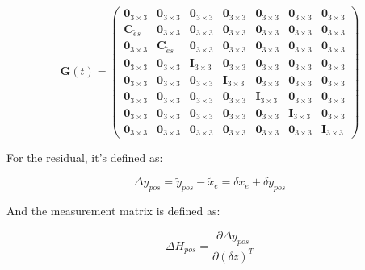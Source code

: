 \documentclass[conference]{IEEEtran}
\begin{document}
\begin{equation}
\mathbf{G}(t)=\left(\begin{array}{ccccccc}
\mathbf{0}_{3 \times 3} & \mathbf{0}_{3 \times 3} & \mathbf{0}_{3 \times 3} & \mathbf{0}_{3 \times 3} & \mathbf{0}_{3 \times 3} & \mathbf{0}_{3 \times 3} & \mathbf{0}_{3 \times 3} \\
\mathbf{C}_{\tilde{e} s} & \mathbf{0}_{3 \times 3} & \mathbf{0}_{3 \times 3} & \mathbf{0}_{3 \times 3} & \mathbf{0}_{3 \times 3} & \mathbf{0}_{3 \times 3} & \mathbf{0}_{3 \times 3} \\
\mathbf{0}_{3 \times 3} & \mathbf{C}_{\tilde{e} s} & \mathbf{0}_{3 \times 3} & \mathbf{0}_{3 \times 3} & \mathbf{0}_{3 \times 3} & \mathbf{0}_{3 \times 3} & \mathbf{0}_{3 \times 3} \\
\mathbf{0}_{3 \times 3} & \mathbf{0}_{3 \times 3} & \mathbf{I}_{3 \times 3} & \mathbf{0}_{3 \times 3} & \mathbf{0}_{3 \times 3} & \mathbf{0}_{3 \times 3} & \mathbf{0}_{3 \times 3} \\
\mathbf{0}_{3 \times 3} & \mathbf{0}_{3 \times 3} & \mathbf{0}_{3 \times 3} & \mathbf{I}_{3 \times 3} & \mathbf{0}_{3 \times 3} & \mathbf{0}_{3 \times 3} & \mathbf{0}_{3 \times 3} \\
\mathbf{0}_{3 \times 3} & \mathbf{0}_{3 \times 3} & \mathbf{0}_{3 \times 3} & \mathbf{0}_{3 \times 3} & \mathbf{I}_{3 \times 3} & \mathbf{0}_{3 \times 3} & \mathbf{0}_{3 \times 3} \\
\mathbf{0}_{3 \times 3} & \mathbf{0}_{3 \times 3} & \mathbf{0}_{3 \times 3} & \mathbf{0}_{3 \times 3} & \mathbf{0}_{3 \times 3} & \mathbf{I}_{3 \times 3} & \mathbf{0}_{3 \times 3} \\
\mathbf{0}_{3 \times 3} & \mathbf{0}_{3 \times 3} & \mathbf{0}_{3 \times 3} & \mathbf{0}_{3 \times 3} & \mathbf{0}_{3 \times 3} & \mathbf{0}_{3 \times 3} & \mathbf{I}_{3 \times 3}
\end{array}\right)
\end{equation}

For the residual, it's defined as:

\begin{equation}
\Delta y_{pos} = \tilde{y}_{pos}-\tilde{x}_{e}=\delta{x}_{e}+\delta{y}_{pos}
\end{equation}

And the measurement matrix is defined as:

\begin{equation}
\Delta H_{pos} = \frac{\partial \Delta y_{pos}}{\partial (\delta z)^T}
\end{equation}
\end{document}
